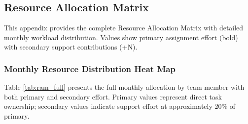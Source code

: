 
\subsection{Resource Allocation Matrix}\label{app:ram}

This appendix provides the complete Resource Allocation Matrix with detailed monthly workload distribution. Values show primary assignment effort (bold) with secondary support contributions (+N).

\subsubsection{Monthly Resource Distribution Heat Map}

Table \ref{tab:ram_full} presents the full monthly allocation by team member with both primary and secondary effort. Primary values represent direct task ownership; secondary values indicate support effort at approximately 20\% of primary.

